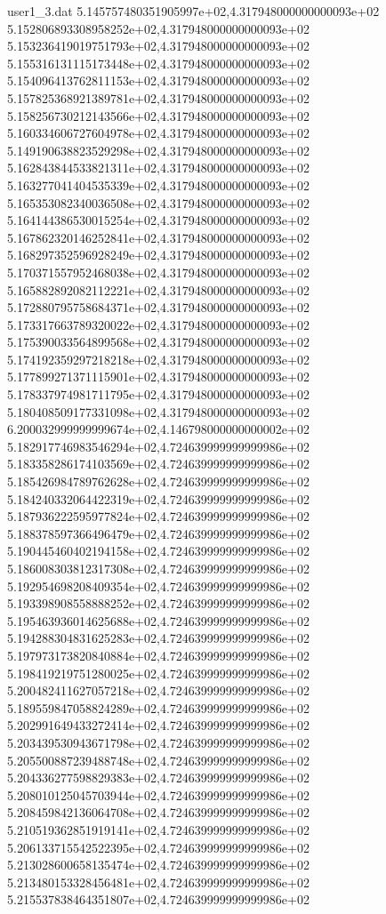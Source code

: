 \begin{filecontents}{user1_3.dat}
5.145757480351905997e+02,4.317948000000000093e+02
5.152806893308958252e+02,4.317948000000000093e+02
5.153236419019751793e+02,4.317948000000000093e+02
5.155316131115173448e+02,4.317948000000000093e+02
5.154096413762811153e+02,4.317948000000000093e+02
5.157825368921389781e+02,4.317948000000000093e+02
5.158256730212143566e+02,4.317948000000000093e+02
5.160334606727604978e+02,4.317948000000000093e+02
5.149190638823529298e+02,4.317948000000000093e+02
5.162843844533821311e+02,4.317948000000000093e+02
5.163277041404535339e+02,4.317948000000000093e+02
5.165353082340036508e+02,4.317948000000000093e+02
5.164144386530015254e+02,4.317948000000000093e+02
5.167862320146252841e+02,4.317948000000000093e+02
5.168297352596928249e+02,4.317948000000000093e+02
5.170371557952468038e+02,4.317948000000000093e+02
5.165882892082112221e+02,4.317948000000000093e+02
5.172880795758684371e+02,4.317948000000000093e+02
5.173317663789320022e+02,4.317948000000000093e+02
5.175390033564899568e+02,4.317948000000000093e+02
5.174192359297218218e+02,4.317948000000000093e+02
5.177899271371115901e+02,4.317948000000000093e+02
5.178337974981711795e+02,4.317948000000000093e+02
5.180408509177331098e+02,4.317948000000000093e+02
6.200032999999999674e+02,4.146798000000000002e+02
5.182917746983546294e+02,4.724639999999999986e+02
5.183358286174103569e+02,4.724639999999999986e+02
5.185426984789762628e+02,4.724639999999999986e+02
5.184240332064422319e+02,4.724639999999999986e+02
5.187936222595977824e+02,4.724639999999999986e+02
5.188378597366496479e+02,4.724639999999999986e+02
5.190445460402194158e+02,4.724639999999999986e+02
5.186008303812317308e+02,4.724639999999999986e+02
5.192954698208409354e+02,4.724639999999999986e+02
5.193398908558888252e+02,4.724639999999999986e+02
5.195463936014625688e+02,4.724639999999999986e+02
5.194288304831625283e+02,4.724639999999999986e+02
5.197973173820840884e+02,4.724639999999999986e+02
5.198419219751280025e+02,4.724639999999999986e+02
5.200482411627057218e+02,4.724639999999999986e+02
5.189559847058824289e+02,4.724639999999999986e+02
5.202991649433272414e+02,4.724639999999999986e+02
5.203439530943671798e+02,4.724639999999999986e+02
5.205500887239488748e+02,4.724639999999999986e+02
5.204336277598829383e+02,4.724639999999999986e+02
5.208010125045703944e+02,4.724639999999999986e+02
5.208459842136064708e+02,4.724639999999999986e+02
5.210519362851919141e+02,4.724639999999999986e+02
5.206133715542522395e+02,4.724639999999999986e+02
5.213028600658135474e+02,4.724639999999999986e+02
5.213480153328456481e+02,4.724639999999999986e+02
5.215537838464351807e+02,4.724639999999999986e+02

\end{filecontents}
